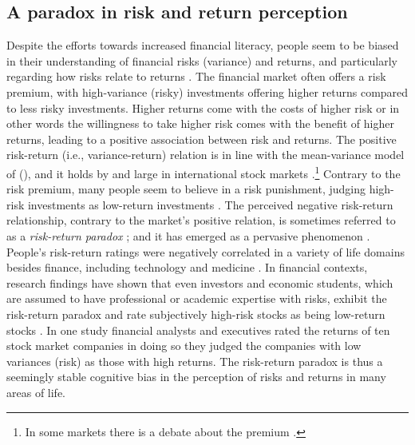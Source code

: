 \documentclass[a4paper,man, natbib,floatsintext]{apa6} %
\begin{document}
\subsection{A paradox in risk and return perception} Despite the efforts towards increased financial literacy, people seem to be biased in their understanding of financial risks (variance) and returns, and particularly regarding how risks relate to returns \citep{Shefrin1995,Ganzach2000,Kempf2014}. The financial market often offers a risk premium, with high-variance (risky) investments offering higher returns compared to less risky investments. Higher returns come with the costs of higher risk or in other words the willingness to take higher risk comes with the benefit of  higher returns, leading to a positive association between risk and returns. The positive risk-return (i.e., variance-return) relation is in line with the mean-variance model of \citeauthor[][]{Markowitz1952} (\citeyear[][]{Markowitz1952}), and it holds by and large in international stock markets \citep[][]{Dimson2003}.\footnote{In some markets there is a debate about the premium \citep[see e.g.,][]{Figenbaum1986}.} Contrary to the risk premium, many people seem to believe in a risk punishment, judging high-risk investments as low-return investments \citep[][]{Shefrin1995, Shefrin2000, Shefrin2001, Kempf2014, Ganzach2000}. The perceived negative risk-return relationship, contrary to the market's positive relation, is sometimes referred to as a  \textit{risk-return paradox} \citep[][]{Figenbaum1986}; and it has emerged as a pervasive phenomenon \citep{Kempf2014,Ganzach2000}. People's risk-return ratings were negatively correlated in a variety of life domains besides finance, including technology and medicine \citep[e.g.][]{Fischhoff1978, Alhakami1994,Sokolowska2015,Fleming2012}. In financial contexts, research findings have shown that even investors and economic students, which are assumed to have professional or academic expertise with risks, exhibit the risk-return paradox and rate subjectively high-risk stocks as being low-return stocks \citep{Kempf2014}. In one study \citep{Shefrin1995} financial analysts and executives rated the returns of ten stock market companies in doing so they judged the companies with low variances (risk) as those with high returns. %
The risk-return paradox is thus a seemingly stable cognitive bias in the perception of risks and returns in many areas of life.
\end{document}
